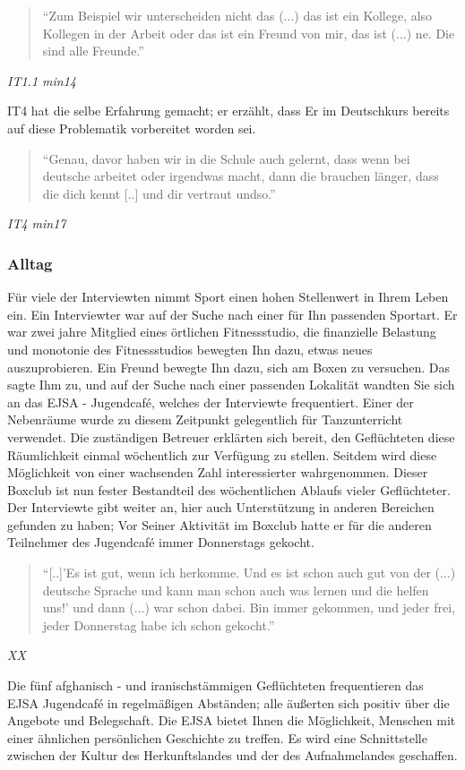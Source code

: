 \begin{quote}
    ``Zum Beispiel wir unterscheiden nicht das (...) das ist ein Kollege, also Kollegen in der Arbeit oder das ist ein Freund von mir, das ist (...) ne. Die sind alle Freunde.''
\end{quote}
\centerline{\textit{IT1.1 min14}}
IT4 hat die selbe Erfahrung gemacht; er erzählt, dass Er im Deutschkurs bereits auf diese Problematik vorbereitet worden sei.
\begin{quote}
    ``Genau, davor haben wir in die Schule auch gelernt, dass wenn bei deutsche arbeitet oder irgendwas macht, dann die brauchen länger, dass die dich kennt [..] und dir vertraut undso.''
\end{quote}
\centerline{\textit{IT4 min17}}

\subsubsection{Alltag}
Für viele der Interviewten nimmt Sport einen hohen Stellenwert in Ihrem Leben ein. Ein Interviewter war auf der Suche nach einer für Ihn passenden Sportart. Er war zwei jahre Mitglied eines örtlichen Fitnessstudio, die finanzielle Belastung und monotonie des Fitnessstudios bewegten Ihn dazu, etwas neues auszuprobieren. Ein Freund bewegte Ihn dazu, sich am Boxen zu versuchen. Das sagte Ihm zu, und auf der Suche nach einer passenden Lokalität wandten Sie sich an das EJSA - Jugendcafé, welches der Interviewte frequentiert. Einer der Nebenräume wurde zu diesem Zeitpunkt gelegentlich für Tanzunterricht verwendet. Die zuständigen Betreuer erklärten sich bereit, den Geflüchteten diese Räumlichkeit einmal wöchentlich zur Verfügung zu stellen. Seitdem wird diese Möglichkeit von einer wachsenden Zahl interessierter wahrgenommen.\newline
Dieser Boxclub ist nun fester Bestandteil des wöchentlichen Ablaufs vieler Geflüchteter. Der Interviewte gibt weiter an, hier auch Unterstützung in anderen Bereichen gefunden zu haben; Vor Seiner Aktivität im Boxclub hatte er für die anderen Teilnehmer des Jugendcafé immer Donnerstags gekocht.
\begin{quote}
    ``[..]'Es ist gut, wenn ich herkomme. Und es ist schon auch gut von der (...) deutsche Sprache und kann man schon auch was lernen und die helfen uns!' und dann (...) war schon dabei. Bin immer gekommen, und jeder frei, jeder Donnerstag habe ich schon gekocht.''
\end{quote}
\centerline{\textit{XX}}
Die fünf afghanisch - und iranischstämmigen Geflüchteten frequentieren das EJSA Jugendcafé in regelmäßigen Abständen; alle äußerten sich positiv über die Angebote und Belegschaft. Die EJSA bietet Ihnen die Möglichkeit, Menschen mit einer ähnlichen persönlichen Geschichte zu treffen. Es wird eine Schnittstelle zwischen der Kultur des Herkunftslandes und der des Aufnahmelandes geschaffen.

